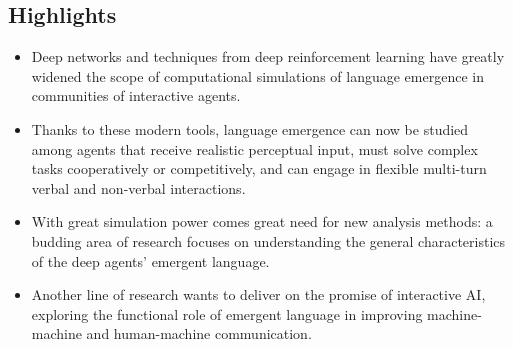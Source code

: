 
\begin{framed}
  \section*{Highlights}
  \begin{itemize}
  \item Deep networks and techniques from deep reinforcement learning
    have greatly widened the scope of computational simulations of language
    emergence in communities of interactive agents.
  \item Thanks to these modern tools, language emergence can now be
    studied among agents that receive realistic perceptual input, must
    solve complex tasks cooperatively or competitively, and can engage
    in flexible multi-turn verbal and non-verbal interactions.
  \item With great simulation power comes great need for new analysis
    methods: a budding area of research focuses on understanding
    the general characteristics of the deep agents' emergent language.
  \item Another line of research wants to deliver on the promise of
    interactive AI, exploring the functional role of emergent
    language in improving machine-machine and human-machine communication.
  \end{itemize}
\end{framed}
